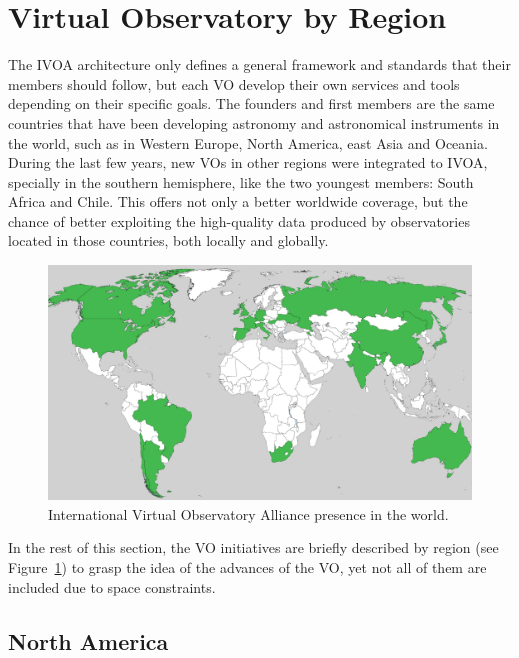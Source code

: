 \section{Virtual Observatory by Region}
\label{sec:vo_services}

The IVOA architecture only defines a general framework and
standards that their members should follow, but each VO develop
their own services and tools depending on their specific goals.
The founders and first members are the same countries that have
been developing astronomy and astronomical instruments in the world,
such as in Western Europe, North America, east Asia and Oceania. During the last
few years,
new VOs in other regions were integrated to IVOA, specially in the southern
hemisphere, like the two youngest members: South Africa and Chile.
This offers not only a better worldwide coverage, but the chance of
better exploiting the high-quality data produced by observatories
located in those countries, both locally and globally.

\begin{figure}%
\begin{center}
   \includegraphics[width=0.9\linewidth]{img/VO-worldwide.png}
   \caption{International Virtual Observatory Alliance presence in the world.}
\label{figure:worldview}
\end{center}
\end{figure}

In the rest of this section, the VO initiatives are briefly
described by region (see Figure~\ref{figure:worldview}) to grasp the idea of the advances of
the VO, yet not all of them are included due to space 
constraints.

\subsection{North America}

